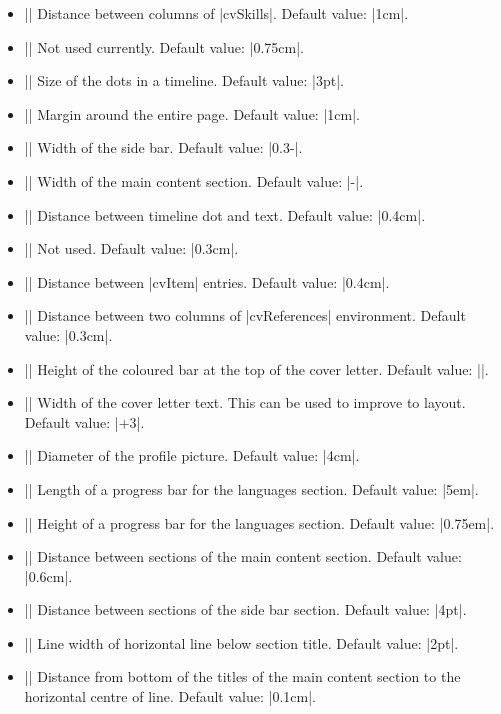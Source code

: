 \documentclass{ltxdoc}
\begin{document}
\begin{itemize}
  \item |\cvColSep| Distance between columns of |cvSkills|. Default value: |1cm|.
  \item |\cvNodeSep| Not used currently. Default value: |0.75cm|.
  \item |\cvTimeDotDiameter| Size of the dots in a timeline. Default value: |3pt|.
  \item |\cvMargin| Margin around the entire page. Default value: |1cm|.
  \item |\cvSideWidth| Width of the side bar. Default value: |0.3\paperwidth-\cvMargin|.
  \item |\cvMainWidth| Width of the main content section. Default value: |\cvMargin-\cvSideWidth|.
  \item |\cvTimeDotSep| Distance between timeline dot and text. Default value: |0.4cm|.
  \item |\cvStartEndSep| Not used. Default value: |0.3cm|.
  \item |\cvItemSep| Distance between |cvItem| entries. Default value: |0.4cm|.
  \item |\cvTableSepWidth| Distance between two columns of |cvReferences| environment. Default value: |0.3cm|.
  \item |\cvCoverLetterHeight| Height of the coloured bar at the top of the cover letter. Default value: |\cvSideWidth|.
  \item |\cvCoverLetterWidth| Width of the cover letter text. This can be used to improve to layout. Default value: |\cvMainWidth+3\cvMargin|.
  \item |\cvPictureWidth| Diameter of the profile picture. Default value: |4cm|.
  \item |\cvProgressAreaWidth| Length of a progress bar for the languages section. Default value: |5em|.
  \item |\cvProgressAreaHeight| Height of a progress bar for the languages section. Default value: |0.75em|.
  \item |\cvSectionSep| Distance between sections of the main content section. Default value: |0.6cm|.
  \item |\cvSectionSBSep| Distance between sections of the side bar section. Default value: |4pt|.
  \item |\cvTitleLineWidth| Line width of horizontal line below section title. Default value: |2pt|.
  \item |\cvTitleLineSpacing| Distance from bottom of the titles of the main content section to the horizontal centre of line. Default value: |0.1cm|.

\end{itemize}
\end{document}
